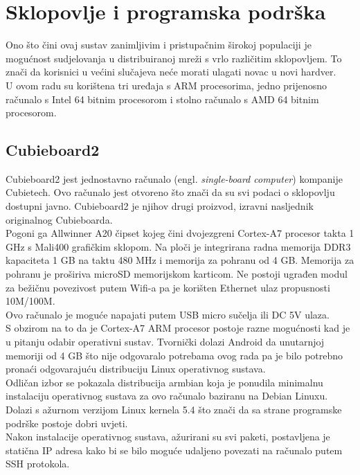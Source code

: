 \documentclass[times, utf8, zavrsni, numeric]{fer}
\begin{document}
\section{Sklopovlje i programska podrška}
Ono što čini ovaj sustav zanimljivim i pristupačnim širokoj populaciji je mogućnost sudjelovanja u distribuiranoj mreži s vrlo
različitim sklopovljem. To znači da korisnici u većini slučajeva neće morati ulagati novac u novi hardver.\\ U ovom radu su korištena
tri uređaja s ARM procesorima, jedno prijenosno računalo s Intel 64 bitnim procesorom i stolno računalo s AMD 64 bitnim procesorom.
\subsection{Cubieboard2}
Cubieboard2 jest jednostavno računalo (engl. \emph{single-board computer}) kompanije Cubietech. Ovo računalo jest otvoreno
što znači da su svi podaci o sklopovlju dostupni javno. Cubieboard2 je njihov drugi proizvod, izravni nasljednik originalnog Cubieboarda.\\
Pogoni ga Allwinner A20 čipset kojeg čini dvojezgreni Cortex-A7 procesor takta 1 GHz s Mali400 grafičkim sklopom. 
Na ploči je integrirana radna memorija DDR3 kapaciteta 1 GB na taktu 480 MHz i memorija za pohranu od 4 GB. Memorija za pohranu je 
proširiva microSD memorijskom karticom.
Ne postoji ugrađen modul za bežičnu povezivost putem Wifi-a pa je korišten Ethernet ulaz propusnosti 10M/100M. \\
Ovo računalo je moguće napajati putem USB micro sučelja ili DC 5V ulaza. \\
S obzirom na to da je Cortex-A7 ARM procesor postoje razne mogućnosti kad je u pitanju odabir operativni sustav. Tvornički dolazi
Android da unutarnjoj memoriji od 4 GB što nije odgovaralo potrebama ovog rada pa je bilo potrebno pronaći odgovarajuću distribuciju
Linux operativnog sustava.\\ Odličan izbor se pokazala distribucija armbian koja je ponudila minimalnu instalaciju operativnog sustava
za ovo računalo baziranu na Debian Linuxu. Dolazi s ažurnom verzijom Linux kernela 5.4 što znači da sa strane programske podrške
postoje dobri uvjeti. \\
Nakon instalacije operativnog sustava, ažurirani su svi paketi, postavljena je statična IP adresa kako bi se bilo moguće udaljeno
povezati na računalo putem SSH protokola. 
\end{document}
